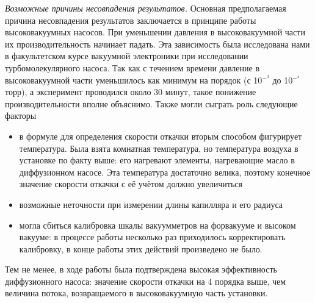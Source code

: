 \documentclass[a4paper]{article}
\begin{document}
\begin{enumerate}
     {\it Возможные причины несовпадения результатов.}
     Основная предполагаемая причина несовпадения результатов заключается в принципе работы высоковакуумных насосов. При уменьшении давления в высоковакуумной части их производительность начинает падать. Эта зависимость была исследована нами в факультетском курсе вакуумной электроники при исследовании турбомолекулярного насоса. Так как с течением времени давление в высоковакуумной части уменьшилось как минимум на порядок (с 10$^-^3$ до 10$^-^4$ торр), а эксперимент проводился около 30 минут, такое понижение производительности вполне объяснимо.
     Также могли сыграть роль следующие факторы
    \begin{itemize}
        \item в формуле для определения скорости откачки вторым способом фигурирует температура. Была взята комнатная температура, но температура воздуха в установке по факту выше: его нагревают элементы, нагревающие масло в диффузионном насосе. Эта температура достаточно велика, поэтому конечное значение скорости откачки с её учётом должно увеличиться
        \item возможные неточности при измерении длины капилляра и его радиуса
        \item могла сбиться калибровка шкалы вакуумметров на форвакууме и высоком вакууме: в процессе работы несколько раз приходилось корректировать калибровку, в конце работы этих действий произведено не было. 
    \end{itemize}
    
    Тем не менее, в ходе работы была подтверждена высокая эффективность диффузионного насоса: значение скорости откачки на 4 порядка выше, чем величина потока, возвращаемого в высоковакуумную часть установки.
\end{enumerate}
\end{document}
